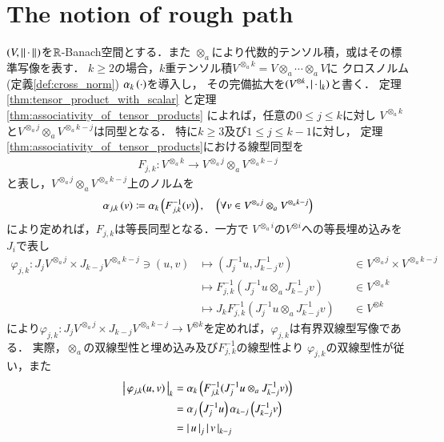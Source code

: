 \section{The notion of rough path}
	$(V,\Norm{\cdot}{})$を$\R$-Banach空間とする．また
	$\otimes_a$により代数的テンソル積，或はその標準写像を表す．
	$k \geq 2$の場合，$k$重テンソル積$V^{\otimes_a k} = V \otimes_a \cdots \otimes_a V$に
	クロスノルム(定義\ref{def:cross_norm}) $\crossnorm{\cdot}{k}$を導入し，
	その完備拡大を$(V^{\otimes k},\compcrossnorm{\cdot}{k})$と書く．
	定理\ref{thm:tensor_product_with_scalar}
	と定理\ref{thm:associativity_of_tensor_products}
	によれば，任意の$0 \leq j \leq k$に対し
	$V^{\otimes_a k}$と$V^{\otimes_a j} \otimes_a V^{\otimes_a k-j}$は同型となる．
	特に$k \geq 3$及び$1 \leq j \leq k-1$に対し，
	定理\ref{thm:associativity_of_tensor_products}における線型同型を
	\begin{align}
		F_{j,k}:V^{\otimes_a k} \longrightarrow V^{\otimes_a j} \otimes_a V^{\otimes_a k-j}
	\end{align}
	と表し，$V^{\otimes_a j} \otimes_a V^{\otimes_a k-j}$上のノルムを
	\begin{align}
		\crossnorm{v}{j,k} \coloneqq \crossnorm{F_{j,k}^{-1}(v)}{k},
		\quad \left( \forall v \in V^{\otimes_a j} \otimes_a V^{\otimes_a k-j} \right)
	\end{align}
	により定めれば，$F_{j,k}$は等長同型となる．一方で
	$V^{\otimes_a i}$の$V^{\otimes i}$への等長埋め込みを$J_i$で表し
	\begin{align}
		\varphi_{j,k}:J_j V^{\otimes_a j} \times J_{k-j} V^{\otimes_a k-j} \ni (u,v)
		& \longmapsto ( J_j^{-1}u,J_{k-j}^{-1}v ) &&\in V^{\otimes_a j} \times V^{\otimes_a k-j} \\
		& \longmapsto F_{j,k}^{-1} (J_j^{-1}u \otimes_a J_{k-j}^{-1}v) &&\in V^{\otimes_a k} \\
		& \longmapsto J_k F_{j,k}^{-1} (J_j^{-1}u \otimes_a J_{k-j}^{-1}v) &&\in V^{\otimes k}
	\end{align}
	により$\varphi_{j,k}:J_j V^{\otimes_a j} \times J_{k-j} V^{\otimes_a k-j}
	\longrightarrow V^{\otimes k}$を定めれば，$\varphi_{j,k}$は有界双線型写像である．
	実際，$\otimes_a$の双線型性と埋め込み及び$F_{j,k}^{-1}$の線型性より
	$\varphi_{j,k}$の双線型性が従い，また
	\begin{align}
		\compcrossnorm{\varphi_{j,k}(u,v)}{k}
		&= \crossnorm{F_{j,k}^{-1} (J_j^{-1}u \otimes_a J_{k-j}^{-1}v)}{k} \\
		&= \crossnorm{J_j^{-1}u}{j} \crossnorm{J_{k-j}^{-1}v}{k-j} \\
		&= \compcrossnorm{u}{j} \compcrossnorm{v}{k-j}
	\end{align}
